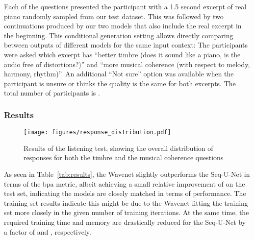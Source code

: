 \documentclass{article}
\begin{document}
Each of the  questions presented the participant with a 1.5 second excerpt of real piano randomly sampled from our test dataset.
This was followed by two continuations produced by our two models that also include the real excerpt in the beginning.
This conditional generation setting allows directly comparing between outputs of different models for the same input context:
The participants were asked which excerpt has ``better timbre (does it sound like a piano, is the audio free of distortions?)''  and ``more musical coherence (with respect to melody, harmony, rhythm)''. 
An additional ``Not sure'' option was available when the participant is unsure or thinks the quality is the same for both excerpts.
The total number of participants is .

\subsubsection{Results}

\begin{figure}[t]
  \centering
  \centerline{\texttt{[image: figures/response\_distribution.pdf]}}
  \caption{Results of the listening test, showing the overall distribution of responses for both the timbre and the musical coherence questions}
  \label{fig:listening_test}
\end{figure}

As seen in Table~\ref{tab:results}, the Wavenet slightly outperforms the Seq-U-Net in terms of the bpa metric, albeit achieving a small relative improvement of  on the test set, indicating the models are closely matched in terms of performance.
The training set results indicate this might be due to the Wavenet fitting the training set more closely in the given number of training iterations.
At the same time, the required training time and memory are drastically reduced for the Seq-U-Net by a factor of  and , respectively.
\end{document}
